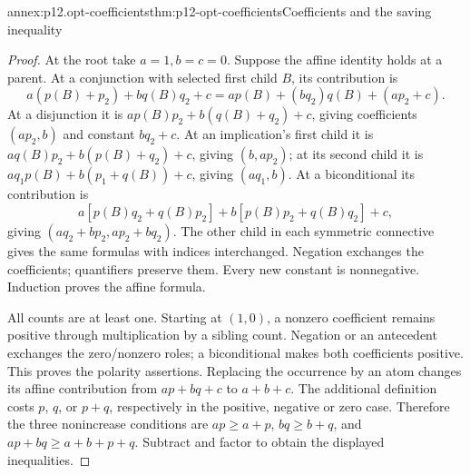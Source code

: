 \begin{annexitem}{annex:p12.opt-coefficients}{thm:p12-opt-coefficients}{Coefficients and the saving inequality}
\begin{proof}
At the root take \(a=1,b=c=0\).
Suppose the affine identity holds at a parent.
At a conjunction with selected first child \(B\), its contribution is
\[
 a(p(B)+p_2)+bq(B)q_2+c
   =a p(B)+(bq_2)q(B)+(ap_2+c).
\]
At a disjunction it is
\(ap(B)p_2+b(q(B)+q_2)+c\), giving coefficients
\((ap_2,b)\) and constant \(bq_2+c\).
At an implication's first child it is
\(aq(B)p_2+b(p(B)+q_2)+c\), giving
\((b,ap_2)\); at its second child it is
\(aq_1p(B)+b(p_1+q(B))+c\), giving \((aq_1,b)\).
At a biconditional its contribution is
\[
 a[p(B)q_2+q(B)p_2]+b[p(B)p_2+q(B)q_2]+c,
\]
giving \((aq_2+bp_2,ap_2+bq_2)\).
The other child in each symmetric connective gives the same formulas
with indices interchanged. Negation exchanges the coefficients;
quantifiers preserve them. Every new constant is nonnegative.
Induction proves the affine formula.

All counts are at least one. Starting at \((1,0)\), a nonzero
coefficient remains positive through multiplication by a sibling
count. Negation or an antecedent exchanges the zero/nonzero roles;
a biconditional makes both coefficients positive. This proves
the polarity assertions.
Replacing the occurrence by an atom changes its affine contribution
from \(ap+bq+c\) to \(a+b+c\).
The additional definition costs \(p\), \(q\), or \(p+q\),
respectively in the positive, negative or zero case. Therefore the
three nonincrease conditions are \(ap\ge a+p\),
\(bq\ge b+q\), and \(ap+bq\ge a+b+p+q\).
Subtract and factor to obtain the displayed inequalities.
\end{proof}
\end{annexitem}

